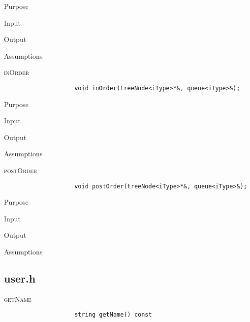 \documentclass[pdftex, 12pt]{article}
\begin{document}
\begin{description}
\begin{description}
\begin{description}
\begin{description}
					\item{Purpose}

					\item{Input}

					\item{Output}

					\item{Assumptions}

				\end{description}
			\item{\textsc{inOrder}}
				\begin{lstlisting}
					void inOrder(treeNode<iType>*&, queue<iType>&);
				\end{lstlisting}
				\begin{description}

					\item{Purpose}

					\item{Input}

					\item{Output}

					\item{Assumptions}

				\end{description}
			\item{\textsc{postOrder}}
				\begin{lstlisting}
					void postOrder(treeNode<iType>*&, queue<iType>&);
				\end{lstlisting}
				\begin{description}

					\item{Purpose}

					\item{Input}

					\item{Output}

					\item{Assumptions}

				\end{description}

		\end{description}
		\subsection{user.h}
		\begin{description}
			\item{\textsc{getName}}
				\begin{lstlisting}
					string getName() const
				\end{lstlisting}
				\begin{description}


\end{description}
\end{description}
\end{description}
\end{description}
\end{document}
